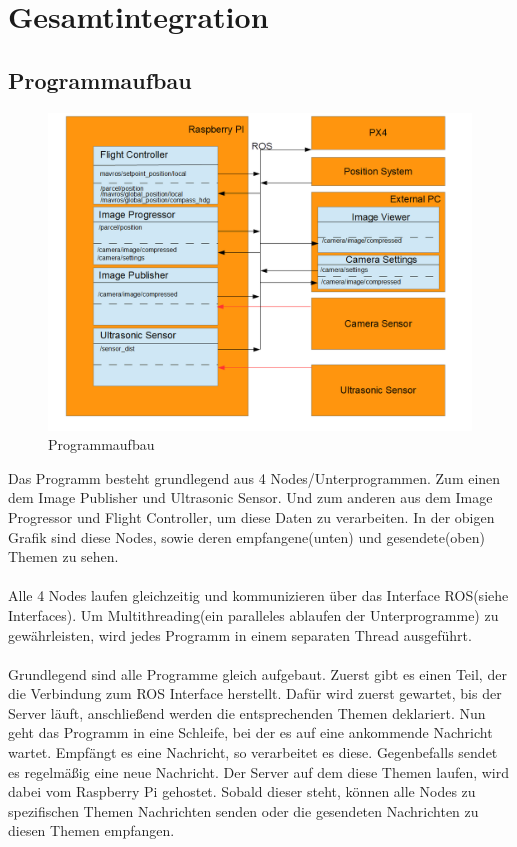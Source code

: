 \section{Gesamtintegration}
\subsection{Programmaufbau}
\begin{figure}[h]
	\centering
	\includegraphics[scale=0.5]{"Grafiken/Nodes.png"}
	\caption{Programmaufbau}
	\label{fig:meine-grafik}
\end{figure}
Das Programm besteht grundlegend aus 4 Nodes/Unterprogrammen. Zum einen dem Image Publisher und Ultrasonic Sensor. Und zum anderen aus dem Image Progressor und Flight Controller, um diese Daten zu verarbeiten. In der obigen Grafik sind diese Nodes, sowie deren empfangene(unten) und gesendete(oben) Themen zu sehen. \\
\\
Alle 4 Nodes laufen gleichzeitig und kommunizieren über das Interface ROS(siehe Interfaces). Um Multithreading(ein paralleles ablaufen der Unterprogramme) zu gewährleisten, wird jedes Programm in einem separaten Thread ausgeführt.\\
\\
Grundlegend sind alle Programme gleich aufgebaut. Zuerst gibt es einen Teil, der die Verbindung zum ROS Interface herstellt. Dafür wird zuerst gewartet, bis der Server läuft, anschließend werden die entsprechenden Themen deklariert. Nun geht das Programm in eine Schleife, bei der es auf eine ankommende Nachricht wartet. Empfängt es eine Nachricht, so verarbeitet es diese. Gegenbefalls sendet es regelmäßig eine neue Nachricht. Der Server auf dem diese Themen laufen, wird dabei vom Raspberry Pi gehostet. Sobald dieser steht, können alle Nodes zu spezifischen Themen Nachrichten senden oder die gesendeten Nachrichten zu diesen Themen empfangen.\\

